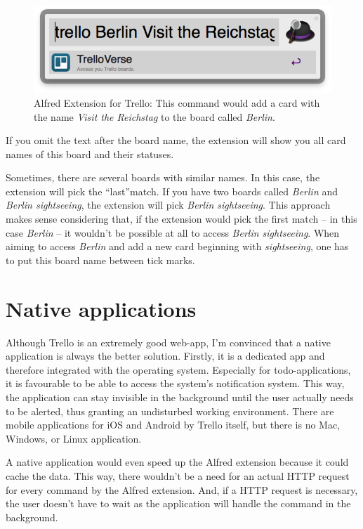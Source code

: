 \begin{figure}[htb]
\centering
\includegraphics[width=\textwidth]{figures/trello-ext.png}
\caption{Alfred Extension for Trello: This command would add a card with the name \emph{Visit the Reichstag} to the board called \emph{Berlin}.}
\label{fig:trello-ext}
\end{figure}

If you omit the text after the board name, the extension will show you all card names of this board and their statuses.

Sometimes, there are several boards with similar names. In this case, the extension will pick the \textquotedblleft last\textquotedblright match. If you have two boards called \emph{Berlin} and \emph{Berlin sightseeing}, the extension will pick \emph{Berlin sightseeing}. This approach makes sense considering that, if the extension would pick the first match -- in this case \emph{Berlin} -- it wouldn't be possible at all to access \emph{Berlin sightseeing}. When aiming to access \emph{Berlin} and add a new card beginning with \emph{sightseeing}, one has to put this board name between tick marks.

\section{Native applications}
Although Trello is an extremely good web-app, I'm convinced that a native application is always the better solution. Firstly, it is a dedicated app and therefore integrated with the operating system. Especially for todo-applications, it is favourable to be able to access the system's notification system. This way, the application can stay invisible in the background until the user actually needs to be alerted, thus granting an undisturbed working environment. There are mobile applications for iOS \cite{trello:ios} and Android \cite{trello:android} by Trello itself, but there is no Mac, Windows, or Linux application.

A native application would even speed up the Alfred extension because it could cache the data. This way, there wouldn't be a need for an actual HTTP request for every command by the Alfred extension. And, if a HTTP request is necessary, the user doesn't have to wait as the application will handle the command in the background.

